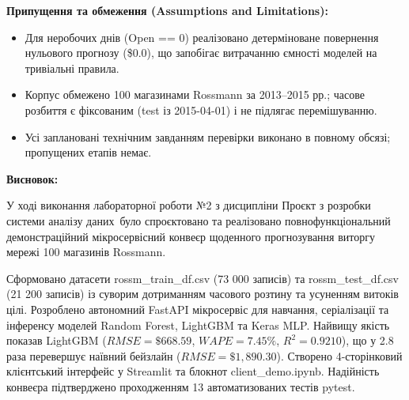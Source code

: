 \documentclass[14pt,a4paper]{extarticle}
\begin{document}
\vspace{2pt}
\noindent\textbf{Припущення та обмеження (Assumptions and Limitations):}
\begin{itemize}[leftmargin=1.5em, itemsep=0pt, topsep=0pt, parsep=0pt]
\item Для неробочих днів (Open == 0) реалізовано детерміноване повернення нульового прогнозу (\$0.0), що запобігає витрачанню ємності моделей на тривіальні правила.
\item Корпус обмежено 100 магазинами Rossmann за 2013--2015 рр.; часове розбиття є фіксованим (test із 2015-04-01) і не підлягає перемішуванню.
\item Усі заплановані технічним завданням перевірки виконано в повному обсязі; пропущених етапів немає.
\end{itemize}

\vspace{2pt}
\noindent\textbf{Висновок:}

У ході виконання лабораторної роботи №2 з дисципліни \textquotedbl Проєкт з розробки системи аналізу даних\textquotedbl~було спроєктовано та реалізовано повнофункціональний демонстраційний мікросервісний конвеєр щоденного прогнозування виторгу мережі 100 магазинів Rossmann.

Сформовано датасети rossm\_train\_df.csv (73 000 записів) та rossm\_test\_df.csv (21 200 записів) із суворим дотриманням часового розтину та усуненням витоків цілі. Розроблено автономний FastAPI мікросервіс для навчання, серіалізації та інференсу моделей Random Forest, LightGBM та Keras MLP. Найвищу якість показав LightGBM ($RMSE = \$668.59$, $WAPE = 7.45\%$, $R^2 = 0.9210$), що у 2.8 раза перевершує наївний бейзлайн ($RMSE = \$1,890.30$). Створено 4-сторінковий клієнтський інтерфейс у Streamlit та блокнот client\_demo.ipynb. Надійність конвеєра підтверджено проходженням 13 автоматизованих тестів pytest.
\end{document}
